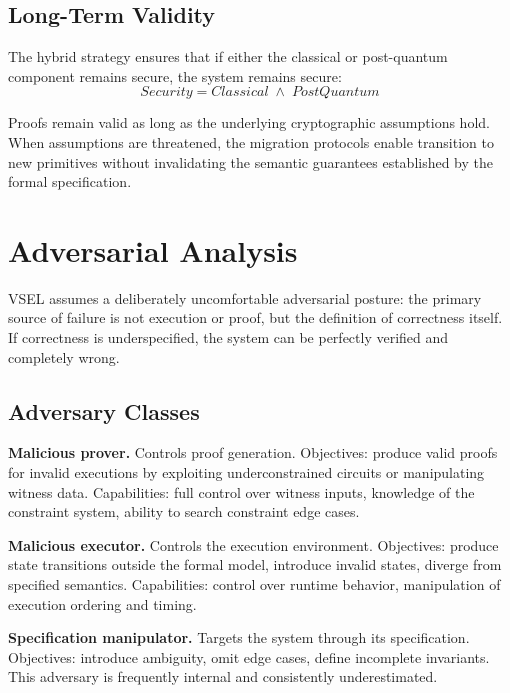 \documentclass[11pt,a4paper]{article}
\theoremstyle{definition}
\begin{document}
\subsection{Long-Term Validity}
\label{subsec:long-term}

The hybrid strategy ensures that if either the classical or post-quantum component remains secure, the system remains secure:
\begin{equation}
\mathit{Security} = \mathit{Classical} \;\land\; \mathit{PostQuantum}
\end{equation}

Proofs remain valid as long as the underlying cryptographic assumptions hold. When assumptions are threatened, the migration protocols enable transition to new primitives without invalidating the semantic guarantees established by the formal specification.

\section{Adversarial Analysis}
\label{sec:adversarial}

VSEL assumes a deliberately uncomfortable adversarial posture: the primary source of failure is not execution or proof, but the definition of correctness itself. If correctness is underspecified, the system can be perfectly verified and completely wrong.

\subsection{Adversary Classes}
\label{subsec:adversary-classes}

\noindent\textbf{Malicious prover.} Controls proof generation. Objectives: produce valid proofs for invalid executions by exploiting underconstrained circuits or manipulating witness data. Capabilities: full control over witness inputs, knowledge of the constraint system, ability to search constraint edge cases.

\noindent\textbf{Malicious executor.} Controls the execution environment. Objectives: produce state transitions outside the formal model, introduce invalid states, diverge from specified semantics. Capabilities: control over runtime behavior, manipulation of execution ordering and timing.

\noindent\textbf{Specification manipulator.} Targets the system through its specification. Objectives: introduce ambiguity, omit edge cases, define incomplete invariants. This adversary is frequently internal and consistently underestimated.
\end{document}
